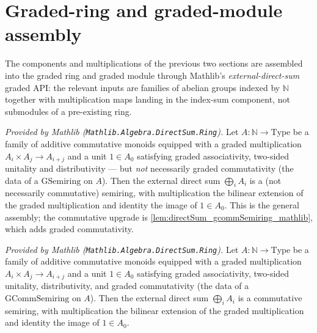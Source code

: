 
\section{Graded-ring and graded-module assembly}
\label{sec:sgr_graded_assembly}

The components and multiplications of the previous two sections are assembled
into the graded ring and graded module through Mathlib's
\emph{external-direct-sum} graded API: the relevant inputs are families of
abelian groups indexed by \(\mathbb{N}\) together with multiplication maps
landing in the index-sum component, not submodules of a pre-existing ring.

\begin{lemma}
  \label{lem:directSum_gsemiring_mathlib}
  \mathlibok
  \textit{Provided by Mathlib (\texttt{Mathlib.Algebra.DirectSum.Ring}).}
  Let \(A : \mathbb{N} \to \mathrm{Type}\) be a family of additive commutative
  monoids equipped with a graded multiplication \(A_i \times A_j \to A_{i+j}\) and
  a unit \(1 \in A_0\) satisfying graded associativity, two-sided unitality and
  distributivity --- but \emph{not} necessarily graded commutativity (the data of
  a \(\mathrm{GSemiring}\) on \(A\)). Then the external direct sum
  \(\bigoplus_i A_i\) is a (not necessarily commutative) semiring, with
  multiplication the bilinear extension of the graded multiplication and identity
  the image of \(1 \in A_0\). This is the general assembly; the commutative
  upgrade is \cref{lem:directSum_gcommSemiring_mathlib}, which adds graded
  commutativity.
\end{lemma}

\begin{lemma}
  \label{lem:directSum_gcommSemiring_mathlib}
  \mathlibok
  \textit{Provided by Mathlib (\texttt{Mathlib.Algebra.DirectSum.Ring}).}
  Let \(A : \mathbb{N} \to \mathrm{Type}\) be a family of additive commutative
  monoids equipped with a graded multiplication
  \(A_i \times A_j \to A_{i+j}\) and a unit \(1 \in A_0\) satisfying graded
  associativity, two-sided unitality, distributivity, and graded commutativity
  (the data of a \(\mathrm{GCommSemiring}\) on \(A\)). Then the external direct
  sum \(\bigoplus_i A_i\) is a commutative semiring, with multiplication the
  bilinear extension of the graded multiplication and identity the image of
  \(1 \in A_0\).
\end{lemma}

